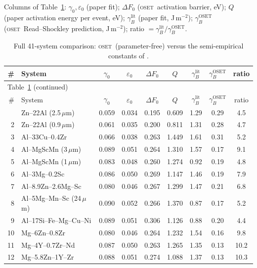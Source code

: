 \documentclass[11pt]{article}
\newcommand{\OSET}{\textsc{oset}}
\newcommand{\dF}{\Delta F_0}
\newcommand{\g}{\gamma_0}
\newcommand{\eps}{\varepsilon_0}
\begin{document}
Columns of Table~\ref{si:tab:hp}: $\g,\eps$ (paper fit); $\dF$ (\OSET\
activation barrier, eV); $Q$ (paper activation energy per event, eV);
$\gamma_B^{\mathrm{lit}}$ (paper fit, J\,m$^{-2}$); $\gamma_B^{\mathrm{OSET}}$
(\OSET\ Read--Shockley prediction, J\,m$^{-2}$); ratio
$=\gamma_B^{\mathrm{lit}}/\gamma_B^{\mathrm{OSET}}$.

\renewcommand{\arraystretch}{0.95}
\begin{longtable}{rlccccccc}
\caption{Full 41-system comparison: \OSET\ (parameter-free) versus the
semi-empirical constants of \citet{S_harisankar2025}.}
\label{si:tab:hp}\\
\toprule
\# & System & $\g$ & $\eps$ & $\dF$ & $Q$ & $\gamma_B^{\mathrm{lit}}$ &
$\gamma_B^{\mathrm{OSET}}$ & ratio\\
\midrule
\endfirsthead
\multicolumn{9}{l}{\small Table~\ref{si:tab:hp} (continued)}\\
\toprule
\# & System & $\g$ & $\eps$ & $\dF$ & $Q$ & $\gamma_B^{\mathrm{lit}}$ &
$\gamma_B^{\mathrm{OSET}}$ & ratio\\
\midrule
\endhead
\bottomrule
\endfoot
1 & Zn--22Al (2.5\,$\mu$m)   & 0.059 & 0.034 & 0.195 & 0.609 & 1.29 & 0.29 & 4.5\\
2 & Zn--22Al (0.9\,$\mu$m)   & 0.061 & 0.035 & 0.200 & 0.811 & 1.31 & 0.28 & 4.7\\
3 & Al--33Cu--0.4Zr          & 0.066 & 0.038 & 0.263 & 1.449 & 1.61 & 0.31 & 5.2\\
4 & Al--MgScMn (3\,$\mu$m)   & 0.089 & 0.051 & 0.264 & 1.310 & 1.57 & 0.17 & 9.1\\
5 & Al--MgScMn (1\,$\mu$m)   & 0.083 & 0.048 & 0.260 & 1.274 & 0.92 & 0.19 & 4.8\\
6 & Al--3Mg--0.2Sc           & 0.086 & 0.050 & 0.269 & 1.147 & 1.46 & 0.19 & 7.9\\
7 & Al--8.9Zn--2.6Mg--Sc     & 0.080 & 0.046 & 0.267 & 1.299 & 1.47 & 0.21 & 6.8\\
8 & Al--5Mg--Mn--Sc (24\,$\mu$m) & 0.090 & 0.052 & 0.266 & 1.370 & 0.87 & 0.17 & 5.2\\
9 & Al--17Si--Fe--Mg--Cu--Ni & 0.089 & 0.051 & 0.306 & 1.126 & 0.88 & 0.20 & 4.4\\
10 & Mg--6Zn--0.8Zr          & 0.080 & 0.046 & 0.264 & 1.232 & 1.54 & 0.16 & 9.8\\
11 & Mg--4Y--0.7Zr--Nd       & 0.087 & 0.050 & 0.263 & 1.265 & 1.35 & 0.13 & 10.2\\
12 & Mg--5.8Zn--1Y--Zr       & 0.088 & 0.051 & 0.274 & 1.088 & 1.37 & 0.13 & 10.3\\

\end{longtable}
\end{document}
